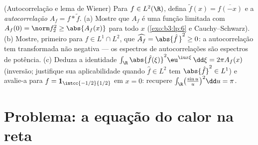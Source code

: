 \begin{exercise}[$\star\star$]\label{exo:b3:fouriertransform:12}
(Autocorrelação e lema de Wiener) Para $f \in L^2(\R)$, defina $\tilde f(x) = \overline{f(-x)}$ e a
\emph{autocorrelação} $A_f = f * \tilde f$.
(a) Mostre que $A_f$ é uma função  limitada com $A_f(0) = \norm f_2^2 \geq \abs{A_f(x)}$ para
todo $x$ (\cref{exo:b3:lp:6} e Cauchy--Schwarz).
(b) Mostre, primeiro para $f \in L^1\cap L^2$, que $\widehat{A_f} = \abs{\hat f\,}^2 \geq 0$: a autocorrelação tem
transformada não negativa --- os espectros de autocorrelações são
espectros de potência.
(c) Deduza a identidade $\int_\R\abs{\hat
f(\xi)}^2\eu^{\iu x\xi}\,\dd\xi = 2\pi A_f(x)$ (inversão; justifique sua aplicabilidade
quando $\hat f \in L^2$ tem $\abs{\hat f}^2 \in L^1$) e avalie-a para $f = \mathbf
1_{\intcc{-1/2}{1/2}}$ em $x = 0$: recupere
$\int_\R\bigl(\frac{\sin u}u\bigr)^2\dd u = \pi$.
\end{exercise}

\section{Problema: a equação do calor na reta}

